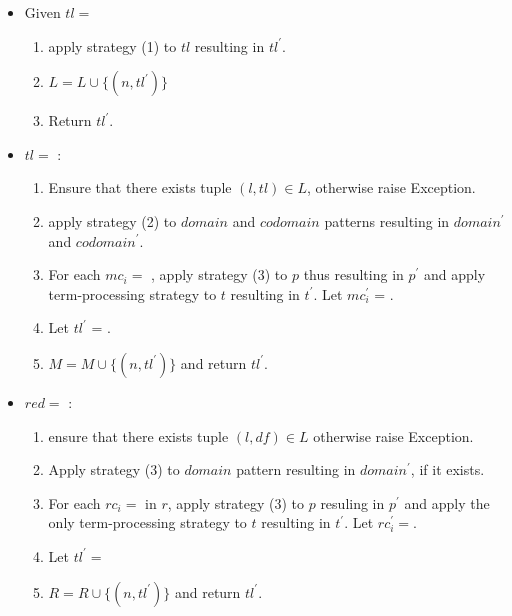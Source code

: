 \begin{itemize}
\item
Given $tl=$\TlDefineLanguage
	\begin{enumerate}
		\item apply strategy (1) to $tl$ resulting in $tl^{\prime}$.
		\item $L = L \cup \{ (n, tl^{\prime}) \}$
		\item Return $tl^{\prime}$.
	\end{enumerate}

\item $tl=$ \TlDefineMetafunction:
	\begin{enumerate}
	\item Ensure that there exists tuple $(l, tl) \in L$, otherwise raise Exception.
	\item apply strategy (2) to $domain$ and $codomain$ patterns resulting in $domain^\prime$ and $codomain^\prime$.
	\item For each $mc_i=$ \MetafunctionCase, apply strategy (3) to $p$ thus resulting in $p^{\prime}$ and apply term-processing strategy to $t$ resulting in $t^{\prime}$. Let $mc_i^{\prime}$ = \MetafunctionCase[$p^{\prime}$][$t^{\prime}$].
	\item Let $tl^\prime$  = .
	\item $M = M \cup \{ (n, tl^\prime)\}$ and return $tl^\prime$.
	\end{enumerate}

\item $red=$ \TlDefineReductionRelation:
\begin{enumerate}
\item ensure that there exists tuple $(l, df) \in L$ otherwise raise Exception.
\item Apply strategy (3) to $domain$ pattern resulting in $domain^\prime$, if it exists.
\item For each $rc_i=$ \ReductionCase \space in $r$, apply strategy (3) to $p$ resuling in $p^{\prime}$ and apply the only term-processing strategy to $t$ resulting in $t^\prime$. Let $rc_i^\prime=$\ReductionCase[$p^{\prime}$][$t^{\prime}$][$n$][false].
\item Let $tl^\prime=$
\item $R = R \cup \{ (n, tl^\prime) \}$ and return $tl^\prime$.

\end{enumerate}


\end{itemize}
